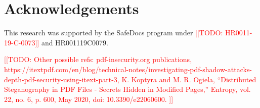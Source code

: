 \documentclass[conference,12pt]{IEEEtran}
\newcommand{\note}[1]{\noteYes{#1}}
\newcommand{\noteYes}[1]{\textcolor{red}{[[#1]]}}
\newcommand{\todo}[1]{\note{TODO: #1}}
\begin{document}
\section*{Acknowledgements}

This research was supported by the SafeDocs program under \todo{HR0011-19-C-0073} and HR001119C0079.

\todo{Other possible refs:
  pdf-insecurity.org publications,
  https://itextpdf.com/en/blog/technical-notes/investigating-pdf-shadow-attacks-depth-pdf-security-using-itext-part-3,
  K. Koptyra and M. R. Ogiela, “Distributed Steganography in PDF Files - Secrets Hidden in Modified Pages,” Entropy, vol. 22, no. 6, p. 600, May 2020, doi: 10.3390/e22060600.
}




\end{document}
